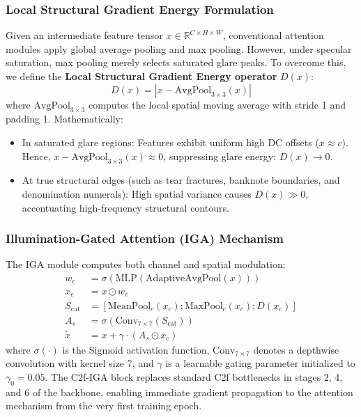 \documentclass[twocolumn]{svjour3}
\begin{document}
\subsubsection{Local Structural Gradient Energy Formulation}
Given an intermediate feature tensor $x \in \mathbb{R}^{C \times H \times W}$, conventional attention modules apply global average pooling and max pooling. However, under specular saturation, max pooling merely selects saturated glare peaks. To overcome this, we define the \textbf{Local Structural Gradient Energy operator} $D(x)$:
\begin{equation}
D(x) = \left| x - \text{AvgPool}_{3\times 3}(x) \right|
\end{equation}
where $\text{AvgPool}_{3\times 3}$ computes the local spatial moving average with stride 1 and padding 1. Mathematically:
\begin{itemize}
    \item In saturated glare regions: Features exhibit uniform high DC offsets ($x \approx c$). Hence, $x - \text{AvgPool}_{3\times 3}(x) \approx 0$, suppressing glare energy: $D(x) \to 0$.
    \item At true structural edges (such as tear fractures, banknote boundaries, and denomination numerals): High spatial variance causes $D(x) \gg 0$, accentuating high-frequency structural contours.
\end{itemize}

\subsubsection{Illumination-Gated Attention (IGA) Mechanism}
The IGA module computes both channel and spatial modulation:
\begin{align}
w_c &= \sigma\left( \text{MLP}\left( \text{AdaptiveAvgPool}(x) \right) \right) \\
x_c &= x \odot w_c \\
S_{\text{cat}} &= \left[ \text{MeanPool}_c(x_c); \text{MaxPool}_c(x_c); D(x_c) \right] \\
A_s &= \sigma\left( \text{Conv}_{7\times 7}\left( S_{\text{cat}} \right) \right) \\
\tilde{x} &= x + \gamma \cdot \left( A_s \odot x_c \right)
\end{align}
where $\sigma(\cdot)$ is the Sigmoid activation function, $\text{Conv}_{7\times 7}$ denotes a depthwise convolution with kernel size 7, and $\gamma$ is a learnable gating parameter initialized to $\gamma_0 = 0.05$. The C2f-IGA block replaces standard C2f bottlenecks in stages 2, 4, and 6 of the backbone, enabling immediate gradient propagation to the attention mechanism from the very first training epoch.
\end{document}

